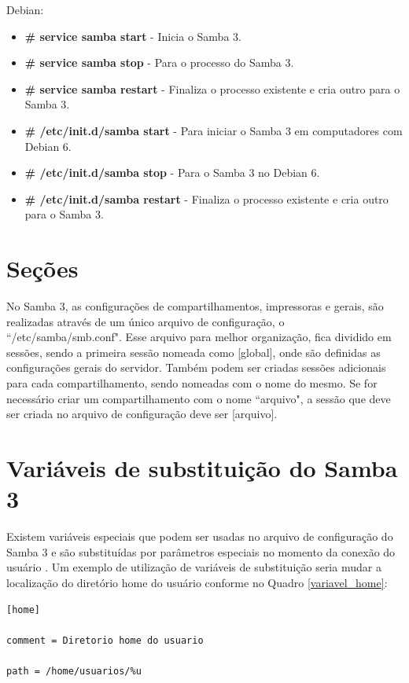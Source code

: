 Debian:
\begin{itemize}
	\item \textbf{\# service samba start} - Inicia o Samba 3.
	\item \textbf{\# service samba stop} - Para o processo do Samba 3.
	\item \textbf{\# service samba restart} - Finaliza o processo existente e cria outro para o Samba 3.
	\item \textbf{\# /etc/init.d/samba start} - Para iniciar o Samba 3 em computadores com Debian 6.
	\item \textbf{\# /etc/init.d/samba stop} - Para o Samba 3 no Debian 6.
	\item \textbf{\# /etc/init.d/samba restart} - Finaliza o processo existente e cria outro para o Samba 3.
\end{itemize}

\section{Seções}

No Samba 3, as configurações de compartilhamentos, impressoras e gerais, são realizadas através de um único arquivo de configuração, o ``/etc/samba/smb.conf". Esse arquivo para melhor organização, fica dividido em sessões, sendo a primeira sessão nomeada como [global], onde são definidas as configurações gerais do servidor. Também podem ser criadas sessões adicionais para cada compartilhamento, sendo nomeadas com o nome do mesmo. Se for necessário criar um compartilhamento com o nome ``arquivo", a sessão que deve ser criada no arquivo de configuração deve ser [arquivo].

\section{Variáveis de substituição do Samba 3}

Existem variáveis especiais que podem ser usadas no arquivo de configuração do Samba 3 e são substituídas por parâmetros especiais no momento da conexão do usuário \cite{FOCA}. Um exemplo de utilização de variáveis de substituição seria mudar a localização do diretório home do usuário conforme no Quadro \ref{variavel_home}:\\

\begin{lstlisting}[caption=Exemplo de utilização das variáveis de substituição,label={variavel_home}]	
[home]
	
comment = Diretorio home do usuario

path = /home/usuarios/%u
\end{lstlisting}          

